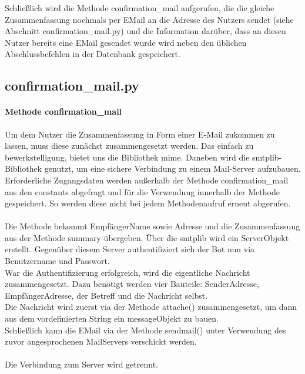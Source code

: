             Schließlich wird die Methode confirmation\_mail aufgerufen, die die gleiche Zusammenfassung nochmals per E\-Mail an die Adresse des Nutzers sendet (siehe Abschnitt confirmation\_mail.py) und die Information darüber, dass an diesen Nutzer bereits eine E\-Mail gesendet wurde wird neben den üblichen Abschlussbefehlen in der Datenbank gespeichert.

                    
        \subsection{confirmation\_mail.py}
            \paragraph{Methode confirmation\_mail}
                Um dem Nutzer die Zusammenfassung in Form einer E-Mail zukommen zu lassen, muss diese zunächst zusammengesetzt werden. Das einfach zu bewerkstelligung, bietet uns die Bibliothek mime. \cite{mime} Daneben wird die smtplib-Bibliothek genutzt, um eine sichere Verbindung zu einem Mail-Server aufzubauen. \cite{smtplib}\\

                Erforderliche Zugangsdaten werden außerhalb der Methode confirmation\_mail aus den constants abgefragt und für die Verwendung innerhalb der Methode gespeichert. So werden diese nicht bei jedem Methodenaufruf erneut abgerufen.\\
                \\
                Die Methode bekommt Empfänger\-Name sowie \-Adresse und die Zusammenfassung aus der Methode summary übergeben. Über die smtplib wird ein Server\-Objekt erstellt. Gegenüber diesem Server authentifiziert sich der Bot nun via Benutzername und Passwort.\\
                War die Authentifizierung erfolgreich, wird die eigentliche Nachricht zusammengesetzt. Dazu benötigt werden vier Bauteile: Sender\-Adresse, Empfänger\-Adresse, der Betreff und die Nachricht selbst.\\
                Die Nachricht wird zuerst via der Methode attache() zusammengesetzt, um dann aus dem vordefinierten String ein message\-Objekt zu bauen.\\
                Schließlich kann die E\-Mail via der Methode sendmail() unter Verwendung des zuvor angesprochenen Mail\-Servers verschickt werden.\\
                \\
                Die Verbindung zum Server wird getrennt.


